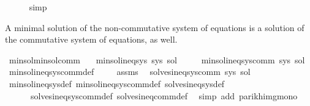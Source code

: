 \begin{isabellebody}
\ \ \ \ \isamarkupfalse%
\ simp\isanewline
{}\isamarkupfalse%
%
\endisatagproof
{\isafoldproof}%
%
\isadelimproof
%
\endisadelimproof
%
\begin{isamarkuptext}%
A minimal solution of the non-commutative system of equations is a solution of the
commutative system of equations, as well.%
\end{isamarkuptext}\isamarkuptrue%
\isamarkupfalse%
\ min{\isacharunderscore}{\kern0pt}sol{\isacharunderscore}{\kern0pt}min{\isacharunderscore}{\kern0pt}sol{\isacharunderscore}{\kern0pt}comm{\isacharcolon}{\kern0pt}\isanewline
\ \ \ {\isachardoublequoteopen}min{\isacharunderscore}{\kern0pt}sol{\isacharunderscore}{\kern0pt}ineq{\isacharunderscore}{\kern0pt}sys\ sys\ sol{\isachardoublequoteclose}\isanewline
\ \ \ \ \ {\isachardoublequoteopen}min{\isacharunderscore}{\kern0pt}sol{\isacharunderscore}{\kern0pt}ineq{\isacharunderscore}{\kern0pt}sys{\isacharunderscore}{\kern0pt}comm\ sys\ sol{\isachardoublequoteclose}\isanewline
%
\isadelimproof
%
\endisadelimproof
%
\isatagproof
{}\isamarkupfalse%
\ min{\isacharunderscore}{\kern0pt}sol{\isacharunderscore}{\kern0pt}ineq{\isacharunderscore}{\kern0pt}sys{\isacharunderscore}{\kern0pt}comm{\isacharunderscore}{\kern0pt}def\ \isamarkupfalse%
\isanewline
\ \ \isamarkupfalse%
\ assms\ \isamarkupfalse%
\ {\isachardoublequoteopen}solves{\isacharunderscore}{\kern0pt}ineq{\isacharunderscore}{\kern0pt}sys{\isacharunderscore}{\kern0pt}comm\ sys\ sol{\isachardoublequoteclose}\isanewline
\ \ \ \ \isamarkupfalse%
\ min{\isacharunderscore}{\kern0pt}sol{\isacharunderscore}{\kern0pt}ineq{\isacharunderscore}{\kern0pt}sys{\isacharunderscore}{\kern0pt}def\ min{\isacharunderscore}{\kern0pt}sol{\isacharunderscore}{\kern0pt}ineq{\isacharunderscore}{\kern0pt}sys{\isacharunderscore}{\kern0pt}comm{\isacharunderscore}{\kern0pt}def\ solves{\isacharunderscore}{\kern0pt}ineq{\isacharunderscore}{\kern0pt}sys{\isacharunderscore}{\kern0pt}def\isanewline
\ \ \ \ \ \ solves{\isacharunderscore}{\kern0pt}ineq{\isacharunderscore}{\kern0pt}sys{\isacharunderscore}{\kern0pt}comm{\isacharunderscore}{\kern0pt}def\ solves{\isacharunderscore}{\kern0pt}ineq{\isacharunderscore}{\kern0pt}comm{\isacharunderscore}{\kern0pt}def\ \isamarkupfalse%
\ {\isacharparenleft}{\kern0pt}simp\ add{\isacharcolon}{\kern0pt}\ parikh{\isacharunderscore}{\kern0pt}img{\isacharunderscore}{\kern0pt}mono{\isacharparenright}{\kern0pt}\isanewline

\end{isabellebody}
